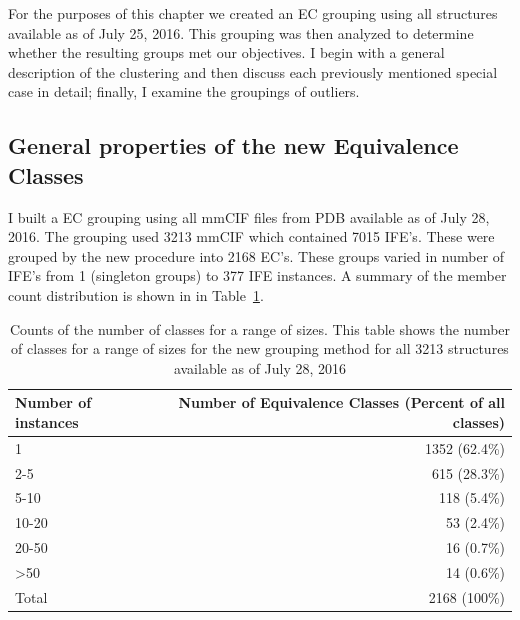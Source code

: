 For the purposes of this chapter we created an EC grouping using all structures
available as of July 25, 2016. This grouping was then analyzed to determine
whether the resulting groups met our objectives. I begin with a general
description of the clustering and then discuss each previously mentioned special
case in detail; finally, I examine the groupings of outliers.

\subsection{General properties of the new Equivalence Classes}

I built a EC grouping using all mmCIF files from PDB available as of July 28,
2016. The grouping used 3213 mmCIF which contained 7015 IFE's. These were
grouped by the new procedure into 2168 EC's. These groups varied in number
of IFE's from 1 (singleton groups) to 377 IFE instances. A summary of the
member count distribution is shown in in Table~\ref{tab:eq-size-dist}.

\begin{table}
  \begin{tabular}{lr}
    \toprule
    Number of instances & Number of Equivalence Classes (Percent of all classes) \\
    \midrule
    1               & 1352 (62.4\%) \\
    2-5             & 615 (28.3\%)  \\
    5-10            & 118 (5.4\%)   \\
    10-20           & 53 (2.4\%)    \\
    20-50           & 16 (0.7\%)    \\
    \textgreater 50 & 14 (0.6\%)    \\
    Total           & 2168 (100\%)  \\
    \bottomrule
  \end{tabular}
  \caption{Counts of the number of classes for a range of sizes. This table
    shows the number of classes for a range of sizes for the new grouping method
  for all 3213 structures available as of July 28, 2016}
  \label{tab:eq-size-dist}
\end{table}

